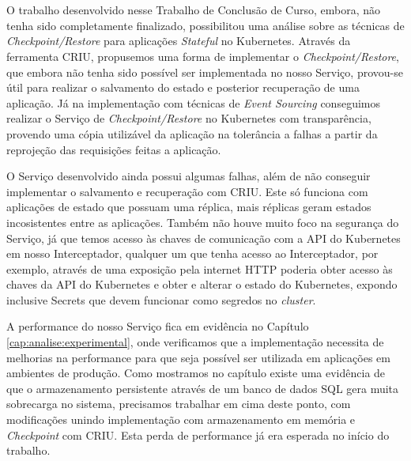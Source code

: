 

\chapter{} \label{cap:conclusion}

	O trabalho desenvolvido nesse Trabalho de Conclusão de Curso, embora, não 
	tenha sido completamente finalizado, possibilitou uma análise sobre as técnicas
	de \textit{Checkpoint/Restore} para aplicações \textit{Stateful} no Kubernetes.
	Através da ferramenta CRIU, propusemos uma forma de implementar o
	\textit{Checkpoint/Restore}, que embora não tenha sido possível ser implementada
	no nosso Serviço, provou-se útil para realizar o salvamento do estado e posterior
	recuperação de uma aplicação. Já na implementação com técnicas de
	\textit{Event Sourcing} conseguimos realizar o Serviço de \textit{Checkpoint/Restore}
	no Kubernetes com transparência, provendo uma cópia utilizável da aplicação na
	tolerância a falhas a partir da reprojeção das requisições feitas a aplicação.
	
	O Serviço desenvolvido ainda possui algumas falhas, além de não conseguir
	implementar	o salvamento e recuperação com CRIU. Este só funciona com aplicações
	de estado que possuam uma réplica, mais réplicas geram estados incosistentes
	entre as aplicações. Também não houve muito foco na segurança do
	Serviço, já que temos acesso às chaves de comunicação com a API do Kubernetes
	em nosso Interceptador, qualquer um que tenha acesso ao Interceptador, por
	exemplo, através de uma exposição pela internet HTTP poderia obter acesso às
	chaves da API do Kubernetes e obter e alterar o estado do Kubernetes, expondo
	inclusive Secrets que devem funcionar como segredos no \textit{cluster}.

	A performance do nosso Serviço fica em evidência no Capítulo \ref{cap:analise:experimental},
	onde verificamos que a implementação necessita de melhorias na performance para
	que seja possível ser utilizada em aplicações em ambientes de produção. Como
	mostramos no capítulo existe uma evidência de que o armazenamento persistente
	através de um banco de dados SQL gera muita sobrecarga no sistema, precisamos
	trabalhar em cima deste ponto, com modificações unindo implementação com
	armazenamento em memória e \textit{Checkpoint} com CRIU. Esta perda de
	performance já era esperada no início do trabalho.

